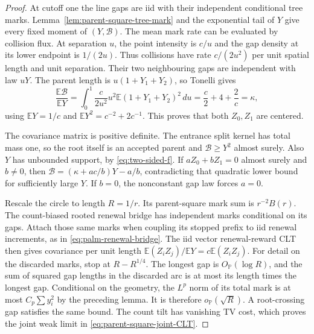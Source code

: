 \documentclass[11pt,letterpaper]{article}
\newcommand{\PP}{\mathbb P}\newcommand{\EE}{\mathbb E}
\begin{document}
\begin{proof}
At cutoff one the line gaps are iid with their independent
conditional tree marks. Lemma~\ref{lem:parent-square-tree-mark}
and the exponential tail of $Y$ give every fixed moment of
$(Y,\mathcal B)$.
The mean mark rate can be evaluated by collision flux. At
separation $u$, the point intensity is $c/u$ and the gap density
at its lower endpoint is $1/(2u)$. Thus collisions have rate
$c/(2u^2)$ per unit spatial length and unit separation.
Their two neighbouring gaps are independent with law $uY$.
The parent length is $u(1+Y_1+Y_2)$, so Tonelli gives
\[
 \frac{\EE\mathcal B}{\EE Y}
   =\int_0^1\frac{c}{2u^2}
                       u^2\EE(1+Y_1+Y_2)^2\,du
   =\frac c2+4+\frac2c=\kappa,
\]
using $\EE Y=1/c$ and $\EE Y^2=c^{-2}+2c^{-1}$.
This proves that both $Z_0,Z_1$ are centered.

The covariance matrix is positive definite. The entrance
split kernel has total mass one, so the root itself is an
accepted parent and $\mathcal B\ge Y^2$ almost surely.
Also $Y$ has unbounded support, by \eqref{eq:two-sided-f}.
If $aZ_0+bZ_1=0$ almost surely and $b\ne0$, then
$\mathcal B=(\kappa+ac/b)Y-a/b$, contradicting that quadratic
lower bound for sufficiently large $Y$. If $b=0$, the
nonconstant gap law forces $a=0$.

Rescale the circle to length $R=1/r$. Its parent-square mark
sum is $r^{-2}B(r)$. The count-biased rooted renewal bridge
has independent marks conditional on its gaps. Attach those
same marks when coupling its stopped prefix to iid renewal
increments, as in \eqref{eq:palm-renewal-bridge}.
The iid vector renewal-reward CLT then gives covariance per
unit length $\EE(Z_iZ_j)/\EE Y=c\EE(Z_iZ_j)$.
For detail on the discarded marks, stop at $R-R^{1/4}$.
The longest gap is $O_{\PP}(\log R)$, and the sum of squared
gap lengths in the discarded arc is at most its length times
the longest gap. Conditional on the geometry, the $L^p$ norm
of its total mark is at most $C_p\sum y_i^2$ by the preceding
lemma. It is therefore $o_{\PP}(\sqrt R)$. A root-crossing
gap satisfies the same bound. The count tilt has vanishing TV
cost, which proves the joint weak limit in
\eqref{eq:parent-square-joint-CLT}.


\end{proof}
\end{document}
